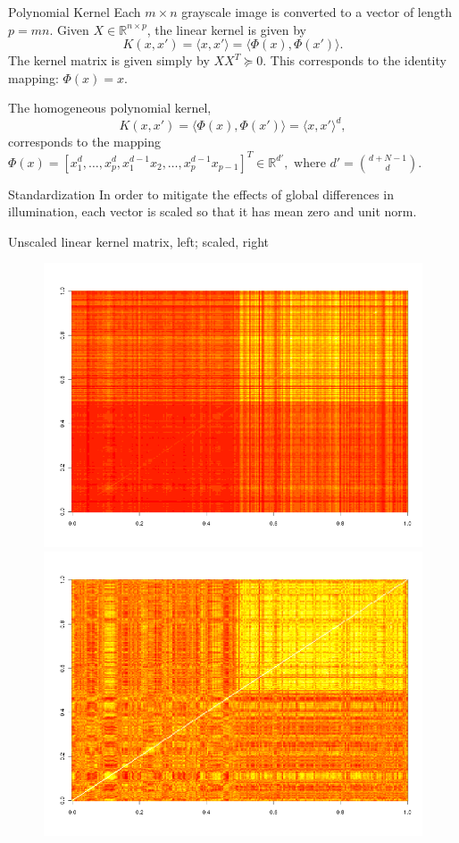 \documentclass{beamer}
\begin{document}
\begin{frame}{Polynomial Kernel}
  Each $m \times n$ grayscale image is converted to a vector of
  length $p=mn$.  \pause
  Given $X \in \mathbb{R}^{n \times p}$, the linear kernel is given by
  $$
  K(x, x') = \langle x, x'\rangle = \langle \Phi(x), \Phi(x')\rangle.
  $$
  The kernel matrix is given simply by $XX^T  \succeq 0$.  This
  corresponds to the identity mapping: $\Phi(x) = x$. \pause

  The homogeneous polynomial kernel,
  $$
  K(x, x') = \langle \Phi(x), \Phi(x')\rangle = \langle x, x' \rangle^d,
  $$
  corresponds to the mapping $\Phi(x) = [x_1^d, \ldots, x_p^d,
  x_1^{d-1}x_2, \ldots, x_p^{d-1}x_{p-1}]^T \in \mathbb{R}^{d'},
  \text{ where } d'=\binom{d+N-1}{d}$.
\end{frame}

\begin{frame}{Standardization}
  In order to mitigate the effects of global differences
  in illumination, each vector is scaled so that it has mean zero and
  unit norm.  \pause

  Unscaled linear kernel matrix, left; scaled, right
  \begin{figure}
    \centering
    \includegraphics[scale=.2]{car-plane-unscaled-1.png}
    \includegraphics[scale=.2]{car-plane-scaled-1.png}
  \end{figure}
\end{frame}
\end{document}
